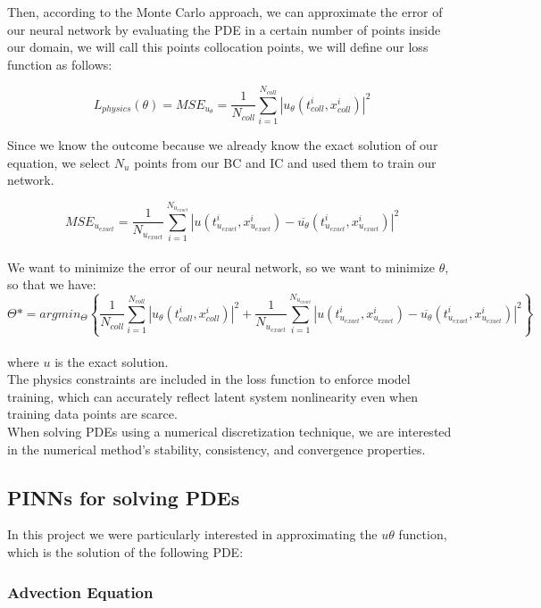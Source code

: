 \documentclass{article}
\begin{document}
Then, according to the Monte Carlo approach, we can approximate the error of our neural network by evaluating the PDE in a certain number of points inside our domain, we will call this points collocation points, we will define our loss function as follows:

$$
 L_{physics}(\theta) = MSE_{u_\theta}=\frac{1}{N_{coll}}\sum^{N_{coll}}_{i=1}|u_\theta(t_{coll}^i,x_{coll}^i)|^2
$$

Since we know the outcome because we already know the exact solution of our equation, we select $N_u$ points from our BC and IC and used them to train our network.

$$MSE_{u_{exact}}=\frac{1}{N_{u_{exact}}}\sum^{N_{u_{exact}}}_{i=1}|u(t_{u_{exact}}^i,x_{u_{exact}}^i)-\overline{u_\theta}(t_{u_{exact}}^i,x_{u_{exact}}^i)|^2$$
\\
We want to minimize the error of our neural network, so we want to minimize $\theta$, so that we have:
\\

$$
\Theta* = argmin_\Theta \left\{ \frac{1}{N_{coll}}\sum^{N_{coll}}_{i=1}|u_\theta(t_{coll}^i,x_{coll}^i)|^2 + \frac{1}{N_{u_{exact}}}\sum^{N_{u_{exact}}}_{i=1}|u(t_{u_{exact}}^i,x_{u_{exact}}^i)-\overline{u_\theta}(t_{u_{exact}}^i,x_{u_{exact}}^i)|^2 \right\}
$$
\\

where $u$ is the exact solution.
\\

The physics constraints are included in the loss function to enforce model training, which can accurately reflect latent system nonlinearity even when training data points are scarce.\\


When solving PDEs using a numerical discretization technique, we are
interested in the numerical method’s stability, consistency, and convergence properties.\\


\subsection{PINNs for solving PDEs} 


In this project we were particularly interested in approximating the $u\theta$ function, which is the solution of the following PDE:

\subsubsection*{Advection Equation}
\end{document}
